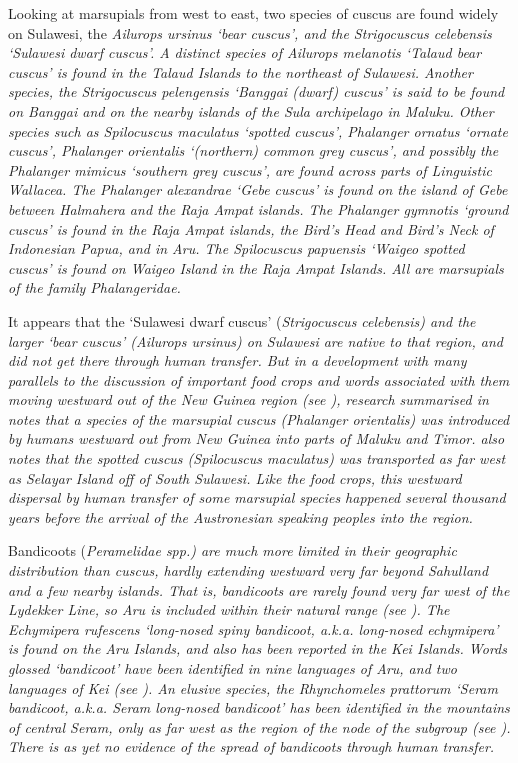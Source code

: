 Looking at marsupials from west to east,
two species of cuscus are found widely on Sulawesi,
the \it{Ailurops ursinus} ‘bear cuscus’,
and the \it{Strigocuscus celebensis} ‘Sulawesi dwarf cuscus’.
A distinct species of \it{Ailurops melanotis} ‘Talaud bear cuscus’
is found in the Talaud Islands to the northeast of Sulawesi.
Another species, the \it{Strigocuscus pelengensis} ‘Banggai (dwarf)
cuscus’ is said to be found on Banggai
and on the nearby islands of the Sula archipelago in Maluku.
Other species such as \it{Spilocuscus maculatus} ‘spotted cuscus’,
\it{Phalanger ornatus} ‘ornate cuscus’,
\it{Phalanger orientalis} ‘(northern) common grey cuscus’,
and possibly the \it{Phalanger mimicus} ‘southern grey cuscus’,
are found across parts of Linguistic Wallacea.
The \it{Phalanger alexandrae} ‘Gebe cuscus’ is found on the island
of Gebe between Halmahera
and the Raja Ampat islands.
The \it{Phalanger gymnotis} ‘ground cuscus’ is found in the Raja
Ampat islands, the Bird’s Head and Bird’s Neck of Indonesian Papua, and in Aru.
The \it{Spilocuscus papuensis} ‘Waigeo spotted cuscus’ is found
on Waigeo Island in the Raja Ampat Islands.
All are marsupials of the family \it{Phalangeridae}.

It appears that the ‘Sulawesi dwarf cuscus’ (\it{Strigocuscus
celebensis}) and the larger ‘bear cuscus’ (\it{Ailurops ursinus}) on Sulawesi
are native to that region,
and did not get there through human transfer.
But in a development with many parallels to the discussion of
important food crops and words associated with them moving westward out of the New
Guinea region (see ),
research summarised in \citet[260]{Schapper2011} notes that a
species of the marsupial cuscus (\it{Phalanger orientalis}) was
introduced by humans westward out from New Guinea into parts
of Maluku and Timor.
\citet[130--132]{Flannery1990} also notes that the spotted cuscus (\it{Spilocuscus
maculatus}) was transported as far west as Selayar Island off of South Sulawesi.
Like the food crops,
this westward dispersal by human transfer of some marsupial species
happened several thousand years before the arrival of the Austronesian
speaking peoples into the region.

Bandicoots (\it{Peramelidae spp.}) are much more limited in
their geographic distribution than cuscus,
hardly extending westward very far beyond Sahulland
and a few nearby islands.
That is, bandicoots are rarely found very far west of the Lydekker
Line, so Aru is included within their natural range (see ).
The \it{Echymipera rufescens} ‘long-nosed spiny bandicoot, a.k.a.
long-nosed echymipera’ is found on the Aru Islands,
and also has been reported in the Kei Islands.
Words glossed ‘bandicoot’ have been identified in nine languages
of Aru, and two languages of Kei (see ).
An elusive species, the \it{Rhynchomeles prattorum} ‘Seram bandicoot, a.k.a.
Seram long-nosed bandicoot’ has been identified in the mountains
of central Seram, only as far west as the region of the 
node of the  subgroup (see ).
There is as yet no evidence of the spread of bandicoots through human transfer.

